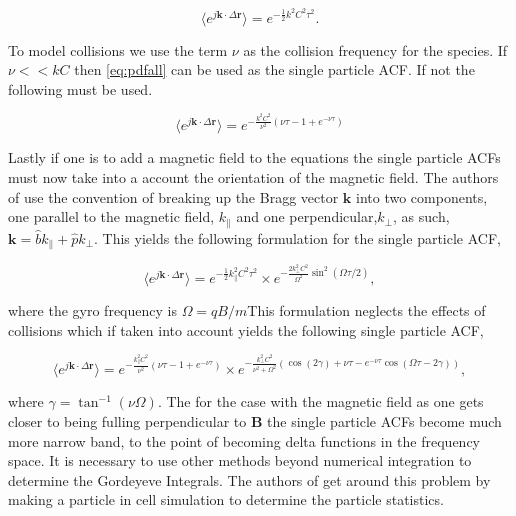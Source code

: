  \begin{equation}
\label{eq:pdfall}
\langle e^{j\mathbf{k}\cdot\Delta \mathbf{r}}\rangle= e^{-\frac{1}{2}k^2C^2 \tau^2}.
\end{equation}
 
 To model collisions we use the term $\nu$ as the collision frequency for the species. If $\nu<<kC$ then \ref{eq:pdfall} can be used as the single particle ACF. If not the following must be used.
 
 \begin{equation}
 \label{eq:colspacf}
 \langle e^{j\mathbf{k}\cdot\Delta \mathbf{r}}\rangle = e^{-\frac{k^2C^2}{\nu^2}\left( \nu \tau-1+e^{-\nu\tau}\right)}
 \end{equation}
 
Lastly if one is to add a magnetic field to the equations the single particle ACFs must now take into a account the orientation of the magnetic field. The authors of \cite{kudeki:milla:1} use the convention of breaking up the Bragg vector $\mathbf{k}$ into two components, one parallel to the magnetic field, $k_{\parallel}$ and one perpendicular,$k_{\perp}$, as such, $\mathbf{k}= \hat{b}k_{\parallel}+\hat{p}k_{\perp}$. This yields the following formulation for the single particle ACF,

 \begin{equation}
\label{eq:pdfmag}
\langle e^{j\mathbf{k}\cdot\Delta \mathbf{r}}\rangle= e^{-\frac{1}{2}k_{\parallel}^2C^2 \tau^2}\times e^{-\frac{2k_{\perp}^2C^2}{\Omega^2} \sin^2(\Omega\tau/2)},
\end{equation}

\noindent where the gyro frequency is $\Omega = qB/m$This formulation neglects the effects of collisions which if taken into account yields the following single particle ACF,

\begin{equation}
\label{eq:colspacf}
\langle e^{j\mathbf{k}\cdot\Delta \mathbf{r}}\rangle = e^{-\frac{k_\parallel^2C^2}{\nu^2}\left( \nu \tau-1+e^{-\nu\tau}\right)}\times e^{-\frac{k_\perp^2C^2}{\nu^2+\Omega^2}\left(\cos(2\gamma) + \nu \tau-e^{-\nu\tau}\cos(\Omega\tau-2\gamma)\right)},
\end{equation}
 
\noindent where $\gamma = \tan^{-1}(\nu\Omega)$. The for the case with the magnetic field as one gets closer to being fulling perpendicular to $\mathbf{B}$ the single particle ACFs become much more narrow band, to the point of becoming delta functions in the frequency space. It is necessary to use other methods beyond numerical integration to determine the Gordeyeve Integrals. The authors of \cite{kudeki:milla:2} get around this problem by making a particle in cell simulation to determine the particle statistics. 


